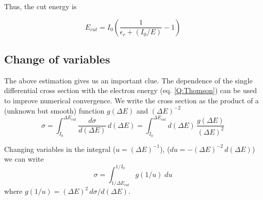 Thus, the cut energy is

$$
E_{cut} = I_{0}\left(\frac{1}{\epsilon_{r} + (I_{0}/E)} - 1 \right)
$$

\subsection{Change of variables}

The above estimation gives us an important clue. The dependence of the
single differential cross section with the electron energy (eq.
\ref{Q:Thomson}) can be used to improve numerical convergence. We write
the cross section as the product of a (unknown but smooth) function
$g(\Delta E)$ and $(\Delta E)^{-2}$
$$
\sigma = \int_{I_{0}}^{\Delta E_{cut}} \frac{d \sigma}{d (\Delta
E)}\, d (\Delta E) = \int_{I_{0}}^{\Delta E_{cut}} d (\Delta E)
\, \frac{g(\Delta E)}{(\Delta E)^{2}}
$$

Changing variables in the integral ($u=(\Delta E)^{-1}$), ($d u =
-(\Delta E)^{-2}\, d (\Delta E)$) we can write
$$
\sigma = \int_{1/\Delta E_{cut}}^{1/I_{0}}g(1/u) \; d u
$$
%
where $g(1/u)= (\Delta E)^{2} \, d \sigma / d (\Delta E)$.

